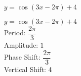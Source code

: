 {$y = \cos (3x - 2\pi) + 4$}
{$y = \cos (3x - 2\pi) + 4$\\
Period: $\dfrac{2\pi}{3}$\\
Amplitude: $1$\\
Phase Shift:  $\dfrac{2\pi}{3}$\\
Vertical Shift: 4

\begin{center}
\end{center}
}

